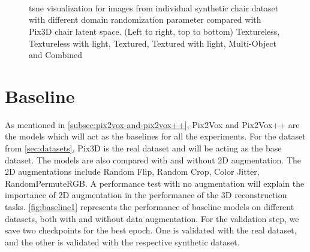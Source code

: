 \begin{figure}[!ht]
    \centering
    \resizebox{0.49\linewidth}{6cm}{}
    \resizebox{0.49\linewidth}{6cm}{}\\
    \resizebox{0.49\linewidth}{6cm}{}
    \resizebox{0.49\linewidth}{6cm}{}\\
    \resizebox{0.49\linewidth}{6cm}{}
    \resizebox{0.49\linewidth}{6cm}{}\\
    \caption{\gls{tsne} visualization for images from individual synthetic chair dataset with different domain randomization parameter compared with Pix3D chair latent space.
        (Left to right, top to bottom) Textureless, Textureless with light, Textured, Textured with light, Multi-Object and Combined}
    \label{fig:tsne per chair dataset}
\end{figure}


\section{Baseline}\label{sec:baseline}

As mentioned in \autoref{subsec:pix2vox-and-pix2vox++}, Pix2Vox and Pix2Vox++ are the models which will act as the baselines for all the experiments.
For the dataset from \autoref{sec:datasets}, Pix3D is the real dataset and will be acting as the base dataset.
The models are also compared with and without 2D augmentation.
The 2D augmentations include Random Flip, Random Crop, Color Jitter, RandomPermuteRGB\@.
A performance test with no augmentation will explain the importance of 2D augmentation in the performance of the 3D reconstruction tasks.
\autoref{fig:baseline1} represents the performance of baseline models on different datasets, both with and without data augmentation.
For the validation step, we save two checkpoints for the best epoch.
One is validated with the real dataset, and the other is validated with the respective synthetic dataset.

